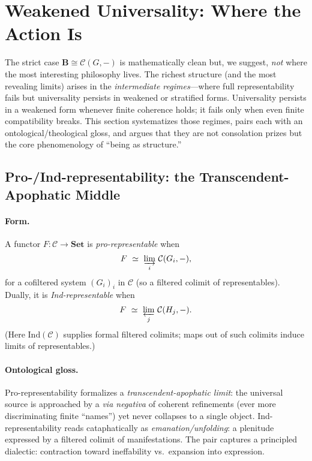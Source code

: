 \documentclass[11pt]{article}
\theoremstyle{upright}
\begin{document}
\section{Weakened Universality: Where the Action Is}\label{sec:intermediate}
\noindent
The strict case $\mathbf B\cong \mathcal C(G,-)$ is mathematically clean but, we suggest, \emph{not} where the most interesting philosophy lives. The richest structure (and the most revealing limits) arises in the \emph{intermediate regimes}---where full representability fails but universality persists in weakened or stratified forms. Universality persists in a weakened form whenever finite coherence holds; it fails only when even finite compatibility breaks. This section systematizes those regimes, pairs each with an ontological/theological gloss, and argues that they are not consolation prizes but the core phenomenology of ``being as structure.'' 

\subsection{Pro-/Ind-representability: the Transcendent-Apophatic Middle}\label{subsec:proind}
\paragraph{Form.}
A functor $F:\mathcal C\to\mathbf{Set}$ is \emph{pro-representable} when
\[
F \ \simeq\ \varinjlim_{i}\, \mathcal C(G_i,-),
\]
for a cofiltered system $(G_i)_{i}$ in $\mathcal C$ (so a filtered colimit of representables). 
Dually, it is \emph{Ind-representable} when
\[
F \ \simeq\ \varprojlim_{j}\, \mathcal C(H_j,-).
\]
(Here $\mathrm{Ind}(\mathcal C)$ supplies formal filtered colimits; maps out of such colimits induce limits of representables.) \citep{ArtinMazur1969}

\paragraph{Ontological gloss.}
Pro-representability formalizes a \emph{transcendent-apophatic limit}: the universal source is approached by a \emph{via negativa} of coherent refinements (ever more discriminating finite ``names'') yet never collapses to a single object. Ind-representability reads cataphatically as \emph{emanation/unfolding}: a plenitude expressed by a filtered colimit of manifestations. The pair captures a principled dialectic: contraction toward ineffability vs.\ expansion into expression.
\end{document}
